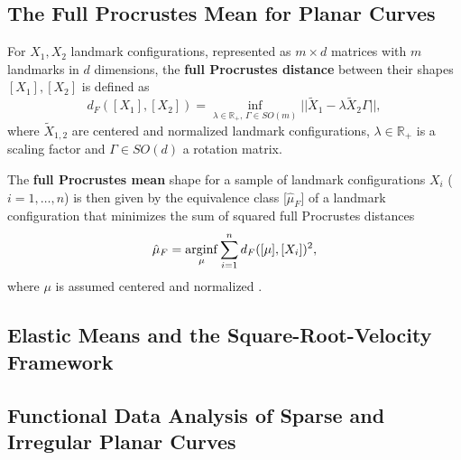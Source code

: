 \subsection{The Full Procrustes Mean for Planar Curves}
\label{theo:proc}
\begin{definition}
    For $X_1, X_2$ landmark configurations, represented as $m \times d$
    matrices with $m$ landmarks in $d$ dimensions, the \textbf{full Procrustes
    distance} between their shapes $[X_1], [X_2]$ is defined as
    $$d_F([X_1], [X_2]) = 
      \inf_{\lambda \in \mathbb{R}_+,\, \Gamma \in SO(m)} ||\widetilde{X}_1 - \lambda
      \widetilde{X}_2\Gamma||, $$
    where $\widetilde{X}_{1,2}$ are centered and normalized landmark
    configurations, $\lambda \in \mathbb{R}_+$ is a scaling factor and $\Gamma
    \in SO(d)$ a rotation matrix.

    The \textbf{full Procrustes mean} shape for a sample of landmark
    configurations $X_i$ ($i = 1,\dots,n$) is then given by the equivalence
    class [$\hat\mu_F$] of a landmark configuration that minimizes the sum of
    squared full Procrustes distances
    $$\hat{\mu}_F = \operatorname*{arginf}_{\mu} \sum_{i=1}^n d_F([\mu], [X_i])^2, $$
    where $\mu$ is assumed centered and normalized
    \parencites[see][71,114]{DrydenMardia2016}.
\end{definition}


\subsection{Elastic Means and the Square-Root-Velocity Framework}
\label{theo:srv}


\subsection{Functional Data Analysis of Sparse and Irregular Planar Curves}
\label{theo:sparse}


\newpage
